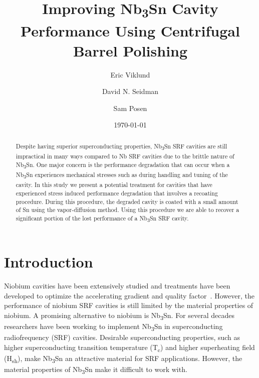 \documentclass{revtex4-2}
\begin{document}
\title{Improving Nb\textsubscript{3}Sn Cavity Performance Using Centrifugal Barrel Polishing}
\author{Eric Viklund}
\author{David N. Seidman}
\author{Sam Posen}


\date{\today}

\begin{abstract}

    Despite having superior superconducting properties, Nb\textsubscript{3}Sn SRF cavities are still impractical in many ways compared to Nb SRF cavities due to the brittle nature of Nb\textsubscript{3}Sn. One major concern is the performance degradation that can occur when a Nb\textsubscript{3}Sn experiences mechanical stresses such as during handling and tuning of the cavity. In this study we present a potential treatment for cavities that have experienced stress induced performance degradation that involves a recoating procedure. During this procedure, the degraded cavity is coated with a small amount of Sn using the vapor-diffusion method. Using this procedure we are able to recover a significant portion of the lost performance of a Nb\textsubscript{3}Sn SRF cavity.

\end{abstract}

\maketitle

\section{Introduction}
\label{sec:Introduction}

Niobium cavities have been extensively studied and treatments have been developed to optimize the accelerating gradient and quality factor~\cite{10.1063/1.4866013, 10.1063/1.4960801, 10.1063/5.0059464, 10.1063/5.0063379}. However, the performance of niobium SRF cavities is still limited by the material properties of niobium. A promising alternative to niobium is Nb\textsubscript{3}Sn. For several decades researchers have been working to implement Nb\textsubscript{3}Sn in superconducting radiofrequency (SRF) cavities.\cite{10.1063/1.4913617, 10.1063/1.4913247} Desirable superconducting properties, such as higher superconducting transition temperature (T\textsubscript{c}) and higher superheating field (H\textsubscript{sh})\cite{liarte2017theoretical, catelani2008temperature, lin2012effect, kubo2020superfluid}, make Nb\textsubscript{3}Sn an attractive material for SRF applications. However, the material properties of Nb\textsubscript{3}Sn make it difficult to work with. 
\end{document}
